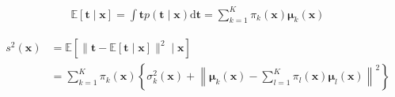 \documentclass{article}
\begin{document}
\begin{align*}
\mathbb{E}[
\mathbf{t} \mid \mathbf{x}]
=\int \mathbf{t} p(\mathbf{t} \mid \mathbf{x}) \mathrm{d} \mathbf{t}=\sum_{k=1}^{K} \pi_{k}(\mathbf{x}) \boldsymbol{\mu}_{k}(\mathbf{x}) 
\tag{6.48}
\end{align*}

\begin{align*}
s^{2}(\mathbf{x}) & =\mathbb{E}\left[
\|\mathbf{t}-\mathbb{E}[
\mathbf{t} \mid \mathbf{x}]
\|^{2} \mid \mathbf{x}\right]
\tag{6.49}\\
& =\sum_{k=1}^{K} \pi_{k}(\mathbf{x})\left\{\sigma_{k}^{2}(\mathbf{x})+\left\|\boldsymbol{\mu}_{k}(\mathbf{x})-\sum_{l=1}^{K} \pi_{l}(\mathbf{x}) \boldsymbol{\mu}_{l}(\mathbf{x})\right\|^{2}\right\}
\tag{6.50}
\end{align*}
\end{document}
